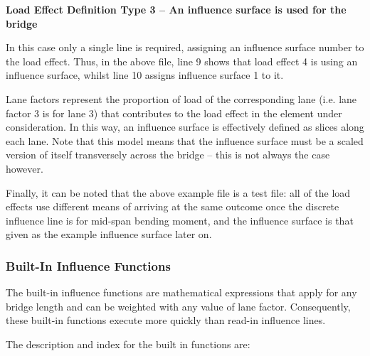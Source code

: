 \documentclass[
]{article}
\begin{document}
\textbf{Load Effect Definition Type 3 -- An influence surface is used
for the bridge}

In this case only a single line is required, assigning an influence
surface number to the load effect. Thus, in the above file, line 9 shows
that load effect 4 is using an influence surface, whilst line 10 assigns
influence surface 1 to it.

Lane factors represent the proportion of load of the corresponding lane
(i.e. lane factor 3 is for lane 3) that contributes to the load effect
in the element under consideration. In this way, an influence surface is
effectively defined as slices along each lane. Note that this model
means that the influence surface must be a scaled version of itself
transversely across the bridge -- this is not always the case however.

Finally, it can be noted that the above example file is a test file: all
of the load effects use different means of arriving at the same outcome
once the discrete influence line is for mid-span bending moment, and the
influence surface is that given as the example influence surface later
on.

\subsubsection*{\texorpdfstring{\hfill\break
Built-In Influence
Functions}{ Built-In Influence Functions}}\label{built-in-influence-functions}

The built-in influence functions are mathematical expressions that apply
for any bridge length and can be weighted with any value of lane factor.
Consequently, these built-in functions execute more quickly than read-in
influence lines.

The description and index for the built in functions are:
\end{document}
